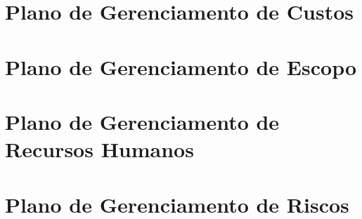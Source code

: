 \begin{anexosenv}
  

\chapter{Plano de Gerenciamento de Custos}

  

\chapter{Plano de Gerenciamento de Escopo}

 

\chapter{Plano de Gerenciamento de Recursos Humanos}

  
  
\chapter{Plano de Gerenciamento de Riscos}

  

  
\end{anexosenv}

